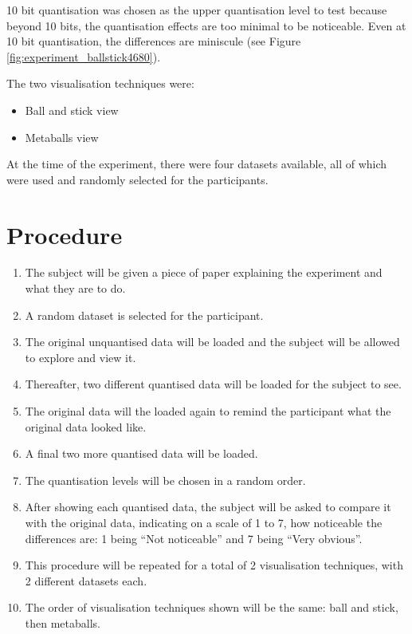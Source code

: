10 bit quantisation was chosen as the upper quantisation level to test because
beyond 10 bits, the quantisation effects are too minimal to be noticeable. Even
at 10 bit quantisation, the differences are miniscule (see Figure
\ref{fig:experiment_ballstick4680}).

The two visualisation techniques were:
\begin{itemize}
  \item Ball and stick view
  \item Metaballs view
\end{itemize}

At the time of the experiment, there were four datasets available, all of which
were used and randomly selected for the participants.


\section{Procedure}
\label{sec:experiment_procedure}

\begin{enumerate}

  \item The subject will be given a piece of paper explaining the experiment
  and what they are to do.

  \item A random dataset is selected for the participant.

  \item The original unquantised data will be loaded and the subject will be
  allowed to explore and view it.

  \item Thereafter, two different quantised data will be loaded for the subject
  to see.

  \item The original data will the loaded again to remind the participant what
  the original data looked like.

  \item A final two more quantised data will be loaded.

  \item The quantisation levels will be chosen in a random order.

  \item After showing each quantised data, the subject will be asked to compare
  it with the original data, indicating on a scale of 1 to 7, how noticeable the
  differences are: 1 being ``Not noticeable'' and 7 being ``Very obvious''.

  \item This procedure will be repeated for a total of 2 visualisation
  techniques, with 2 different datasets each.

  \item The order of visualisation techniques shown will be the same: ball and
  stick, then metaballs.

\end{enumerate}

